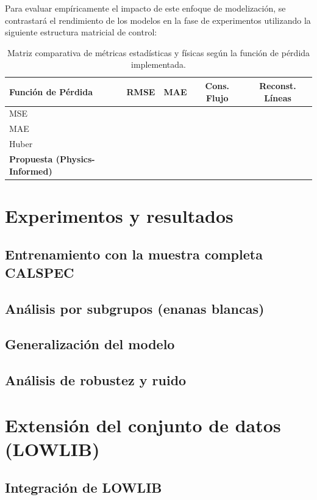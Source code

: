 \documentclass{article}
\begin{document}
Para evaluar empíricamente el impacto de este enfoque de modelización, se contrastará el rendimiento de los modelos en la fase de experimentos utilizando la siguiente estructura matricial de control:

\begin{table}[H]
\centering
\begin{tabular}{l|c|c|c|c}
\textbf{Función de Pérdida} & \textbf{RMSE} & \textbf{MAE} & \textbf{Cons. Flujo} & \textbf{Reconst. Líneas} \\
\hline
MSE & & & & \\
MAE & & & & \\
Huber & & & & \\
\hline
\textbf{Propuesta (Physics-Informed)} & & & & \\
\end{tabular}
\caption{Matriz comparativa de métricas estadísticas y físicas según la función de pérdida implementada.}
\label{tab:loss_comparison}
\end{table}




\newpage
\section{Experimentos y resultados}
\subsection{Entrenamiento con la muestra completa CALSPEC}
\subsection{Análisis por subgrupos (enanas blancas)}
\subsection{Generalización del modelo}
\subsection{Análisis de robustez y ruido}



\newpage
\section{Extensión del conjunto de datos (LOWLIB)}
\subsection{Integración de LOWLIB}
\end{document}
